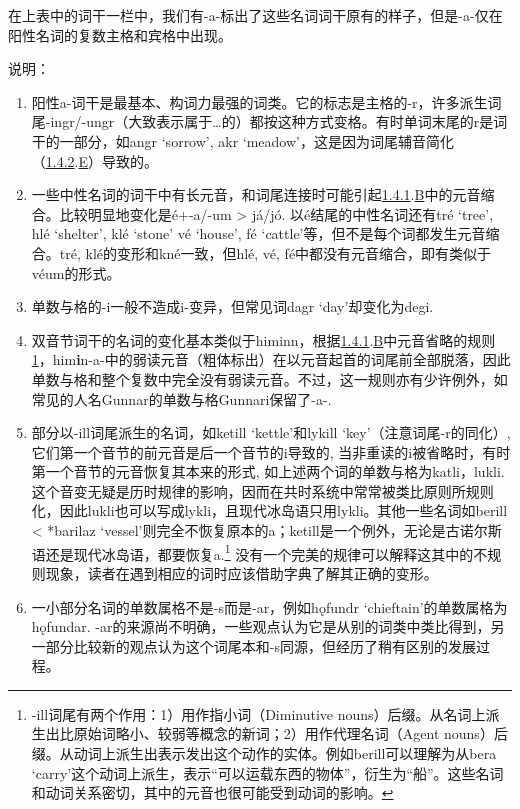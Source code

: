 在上表中的词干一栏中，我们有-a-标出了这些名词词干原有的样子，但是-a-仅在阳性名词的复数主格和宾格中出现。

说明：

\begin{enumerate}
\def\labelenumi{\arabic{enumi})}
\item
  阳性a-词干是最基本、构词力最强的词类。它的标志是主格的-r，许多派生词尾-ingr/-ungr（大致表示属于\ldots 的）都按这种方式变格。有时单词末尾的r是词干的一部分，如angr
  `sorrow', akr
  `meadow'，这是因为词尾辅音简化（\hyperref[ux8f85ux97f3ux7684ux97f3ux53d8]{1.4.2}.\hyperref[_Ref115765758]{E}）导致的。
\item
  一些中性名词的词干中有长元音，和词尾连接时可能引起\hyperref[ux5143ux97f3ux7684ux97f3ux53d8]{1.4.1}.\hyperref[_Ref115693879]{B}中的元音缩合。比较明显地变化是é+-a/-um
  \textgreater{} já/jó. 以é结尾的中性名词还有tré `tree', hlé `shelter',
  klé `stone' vé `house', fé
  `cattle'等，但不是每个词都发生元音缩合。tré,
  klé的变形和kné一致，但hlé, vé,
  fé中都没有元音缩合，即有类似于véum的形式。
\item
  单数与格的-i一般不造成i-变异，但常见词dagr `day'却变化为degi.
\item
  双音节词干的名词的变化基本类似于himinn，根据\hyperref[ux5143ux97f3ux7684ux97f3ux53d8]{1.4.1}.\hyperref[_Ref115693879]{B}中元音省略的规则\hyperref[_Ref115694569]{1}，him\textbf{i}n-a-中的弱读元音（粗体标出）在以元音起首的词尾前全部脱落，因此单数与格和整个复数中完全没有弱读元音。不过，这一规则亦有少许例外，如常见的人名Gunnar的单数与格Gunnari保留了-a-.
\item
  部分以-ill词尾派生的名词，如ketill `kettle'和lykill
  `key'（注意词尾-r的同化）,
  它们第一个音节的前元音是后一个音节的i导致的,
  当非重读的i被省略时，有时第一个音节的元音恢复其本来的形式,
  如上述两个词的单数与格为katli，lukli.
  这个音变无疑是历时规律的影响，因而在共时系统中常常被类比原则所规则化，因此lukli也可以写成lykli，且现代冰岛语只用lykli。其他一些名词如berill
  \textless{} *barilaz
  `vessel'则完全不恢复原本的a；ketill是一个例外，无论是古诺尔斯语还是现代冰岛语，都要恢复a.\footnote{-ill词尾有两个作用：1）用作指小词（Diminutive
    nouns）后缀。从名词上派生出比原始词略小、较弱等概念的新词；2）用作代理名词（Agent
    nouns）后缀。从动词上派生出表示发出这个动作的实体。例如berill可以理解为从bera
    `carry'这个动词上派生，表示``可以运载东西的物体''，衍生为``船''。这些名词和动词关系密切，其中的元音也很可能受到动词的影响。}
  没有一个完美的规律可以解释这其中的不规则现象，读者在遇到相应的词时应该借助字典了解其正确的变形。
\item
  一小部分名词的单数属格不是-s而是-ar，例如hǫfundr
  `chieftain'的单数属格为hǫfundar.
  -ar的来源尚不明确，一些观点认为它是从别的词类中类比得到，另一部分比较新的观点认为这个词尾本和-s同源，但经历了稍有区别的发展过程。
\end{enumerate}


